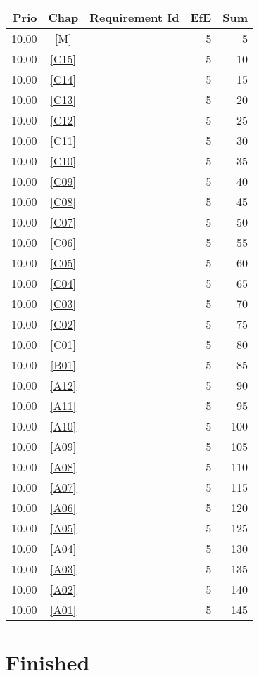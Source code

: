 \begin{longtable}{|r|c|p{7cm}||r|r|} \hline
\textbf{Prio} & \textbf{Chap} & \textbf{Requirement Id} & \textbf{EfE} & \textbf{Sum} \\ \hline\endhead
10.00 & \ref{M} & \nameref{M} & 5 & 5 \\ \hline
10.00 & \ref{C15} & \nameref{C15} & 5 & 10 \\ \hline
10.00 & \ref{C14} & \nameref{C14} & 5 & 15 \\ \hline
10.00 & \ref{C13} & \nameref{C13} & 5 & 20 \\ \hline
10.00 & \ref{C12} & \nameref{C12} & 5 & 25 \\ \hline
10.00 & \ref{C11} & \nameref{C11} & 5 & 30 \\ \hline
10.00 & \ref{C10} & \nameref{C10} & 5 & 35 \\ \hline
10.00 & \ref{C09} & \nameref{C09} & 5 & 40 \\ \hline
10.00 & \ref{C08} & \nameref{C08} & 5 & 45 \\ \hline
10.00 & \ref{C07} & \nameref{C07} & 5 & 50 \\ \hline
10.00 & \ref{C06} & \nameref{C06} & 5 & 55 \\ \hline
10.00 & \ref{C05} & \nameref{C05} & 5 & 60 \\ \hline
10.00 & \ref{C04} & \nameref{C04} & 5 & 65 \\ \hline
10.00 & \ref{C03} & \nameref{C03} & 5 & 70 \\ \hline
10.00 & \ref{C02} & \nameref{C02} & 5 & 75 \\ \hline
10.00 & \ref{C01} & \nameref{C01} & 5 & 80 \\ \hline
10.00 & \ref{B01} & \nameref{B01} & 5 & 85 \\ \hline
10.00 & \ref{A12} & \nameref{A12} & 5 & 90 \\ \hline
10.00 & \ref{A11} & \nameref{A11} & 5 & 95 \\ \hline
10.00 & \ref{A10} & \nameref{A10} & 5 & 100 \\ \hline
10.00 & \ref{A09} & \nameref{A09} & 5 & 105 \\ \hline
10.00 & \ref{A08} & \nameref{A08} & 5 & 110 \\ \hline
10.00 & \ref{A07} & \nameref{A07} & 5 & 115 \\ \hline
10.00 & \ref{A06} & \nameref{A06} & 5 & 120 \\ \hline
10.00 & \ref{A05} & \nameref{A05} & 5 & 125 \\ \hline
10.00 & \ref{A04} & \nameref{A04} & 5 & 130 \\ \hline
10.00 & \ref{A03} & \nameref{A03} & 5 & 135 \\ \hline
10.00 & \ref{A02} & \nameref{A02} & 5 & 140 \\ \hline
10.00 & \ref{A01} & \nameref{A01} & 5 & 145 \\ \hline
\end{longtable}\section{Finished}
